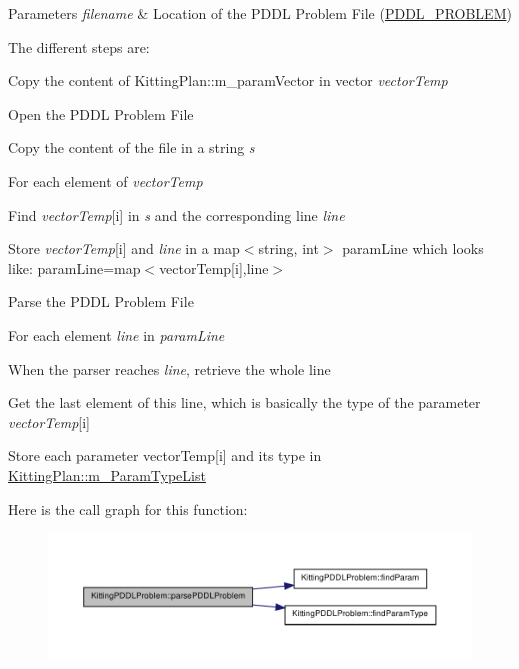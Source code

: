 \begin{DoxyParams}{Parameters}
{\em filename} & Location of the PDDL Problem File (\hyperlink{_config_8h_ad46b4ff0da0e50fb33755379221faf62}{PDDL\_\-PROBLEM})\\
\hline
\end{DoxyParams}
The different steps are: 
\begin{DoxyItemize}
\item Copy the content of KittingPlan::m\_\-paramVector in vector {\itshape vectorTemp\/} 
\item Open the PDDL Problem File 
\item Copy the content of the file in a string {\itshape s\/} 
\item For each element of {\itshape vectorTemp\/} 
\begin{DoxyItemize}
\item Find {\itshape vectorTemp\/}\mbox{[}i\mbox{]} in {\itshape s\/} and the corresponding line {\itshape line\/} 
\item Store {\itshape vectorTemp\/}\mbox{[}i\mbox{]} and {\itshape line\/} in a map$<$string, int$>$ paramLine which looks like: paramLine=map$<$vectorTemp\mbox{[}i\mbox{]},line$>$ 
\end{DoxyItemize}
\item Parse the PDDL Problem File 
\begin{DoxyItemize}
\item For each element {\itshape line\/} in {\itshape paramLine\/} 
\begin{DoxyItemize}
\item When the parser reaches {\itshape line\/}, retrieve the whole line 
\item Get the last element of this line, which is basically the type of the parameter {\itshape vectorTemp\/}\mbox{[}i\mbox{]} 
\item Store each parameter vectorTemp\mbox{[}i\mbox{]} and its type in \hyperlink{class_kitting_plan_a202e80e92752c93ea614b574c4b1fc00}{KittingPlan::m\_\-ParamTypeList} 
\end{DoxyItemize}
\end{DoxyItemize}
\end{DoxyItemize}

Here is the call graph for this function:\nopagebreak
\begin{figure}[H]
\begin{center}
\leavevmode
\includegraphics[width=400pt]{class_kitting_p_d_d_l_problem_ab3d83970ecca959e48915bd91104769c_cgraph}
\end{center}
\end{figure}




